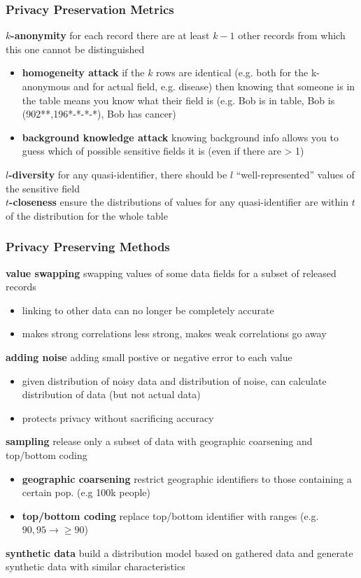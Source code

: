 \documentclass[]{article}
\theoremstyle{definition}
\begin{document}
	\subsubsection{Privacy Preservation Metrics}
	\textbf{$k$-anonymity} for each record there are at least $k-1$ other records from which this one cannot be distinguished
	\begin{itemize}
		\item \textbf{homogeneity attack} if the $k$ rows are identical (e.g. both for the k-anonymous and for actual field, e.g. disease) then knowing that someone is in the table means you know what their field is (e.g. Bob is in table, Bob is (902**,196*-*-*-*), Bob has cancer)
		\item \textbf{background knowledge attack} knowing background info allows you to guess which of possible sensitive fields it is (even if there are > 1)
	\end{itemize}
	\textbf{$l$-diversity} for any quasi-identifier, there should be $l$ ``well-represented'' values of the sensitive field \\
	\textbf{$t$-closeness} ensure the distributions of values for any quasi-identifier are within $t$ of the distribution for the whole table

	\subsubsection{Privacy Preserving Methods}
	\textbf{value swapping} swapping values of some data fields for a subset of released records
	\begin{itemize}
		\item linking to other data can no longer be completely accurate
		\item makes strong correlations less strong, makes weak correlations go away
	\end{itemize}
	\textbf{adding noise} adding small postive or negative error to each value
	\begin{itemize}
		\item given distribution of noisy data and distribution of noise, can calculate distribution of data (but not actual data)
		\item protects privacy without sacrificing accuracy
	\end{itemize}
	\textbf{sampling} release only a subset of data with geographic coarsening and top/bottom coding 
	\begin{itemize}
		\item \textbf{geographic coarsening} restrict geographic identifiers to those containing a certain pop. (e.g 100k people)
		\item \textbf{top/bottom coding} replace top/bottom identifier with ranges (e.g. $90, 95 \rightarrow \ge 90$)
	\end{itemize}
	\textbf{synthetic data} build a distribution model based on gathered data and generate synthetic data with similar characteristics
\end{document}
